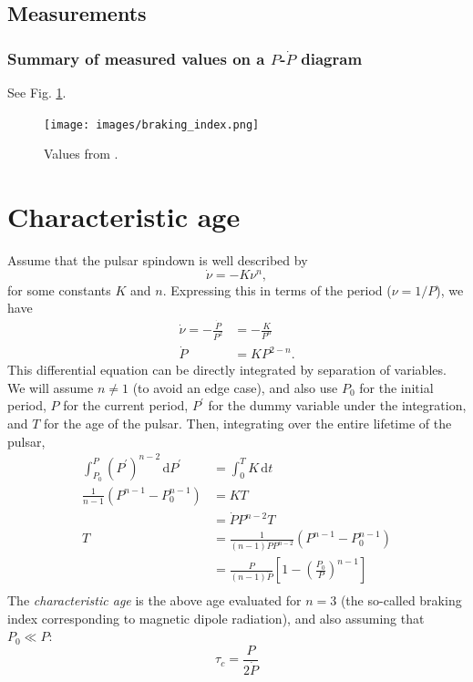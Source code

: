 \documentclass{book}
\begin{document}
\subsection{Measurements}

\subsubsection{Summary of measured values on a $P$-$\dot{P}$ diagram}

See Fig. \ref{fig:braking_index_measurements}.
\begin{figure}[!t]
    \centering
    \texttt{[image: images/braking\_index.png]}
    \caption{Values from \citet{Archibald2016}.}
    \label{fig:braking_index_measurements}
\end{figure}


\section{Characteristic age}

\citep[This same derivation is given briefly in][\S3.2.2.]{Lorimer2005}
Assume that the pulsar spindown is well described by
\begin{equation}
    \dot{\nu} = -K\nu^n,
\end{equation}
for some constants $K$ and $n$.
Expressing this in terms of the period ($\nu = 1/P$), we have
\begin{equation}
    \begin{aligned}
        \dot{\nu} = -\frac{\dot{P}}{P^2}
            &= -\frac{K}{P^n} \\
        \dot{P} &= KP^{2-n}.
    \end{aligned}
\end{equation}
This differential equation can be directly integrated by separation of variables.
We will assume $n \ne 1$ (to avoid an edge case), and also use $P_0$ for the initial period, $P$ for the current period, $P^\prime$ for the dummy variable under the integration, and $T$ for the age of the pulsar.
Then, integrating over the entire lifetime of the pulsar,
\begin{equation}
    \begin{aligned}
        \int_{P_0}^{P} (P^\prime)^{n-2}\,\text{d}P^\prime
            &= \int_0^T K\,\text{d}t \\
        \frac{1}{n-1}\left(P^{n-1} - P_0^{n-1}\right)
            &= KT \\
            &= \dot{P} P^{n-2} T \\
        T   &= \frac{1}{(n-1)\dot{P}P^{n-2}}\left(P^{n-1} - P_0^{n-1}\right) \\
            &= \frac{P}{(n-1)\dot{P}}\left[1 - \left(\frac{P_0}{P}\right)^{n-1}\right] \\
    \end{aligned}
\end{equation}
The \emph{characteristic age} is the above age evaluated for $n = 3$ (the so-called braking index corresponding to magnetic dipole radiation), and also assuming that $P_0 \ll P$:
\begin{equation}
    \tau_c = \frac{P}{2\dot{P}}
\end{equation}
\end{document}
